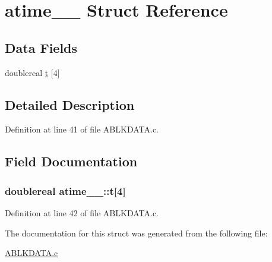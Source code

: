 \hypertarget{structatime__1__}{}\section{atime\+\_\+\_\+ Struct Reference}
\label{structatime__1__}
\subsection*{Data Fields}
\begin{DoxyCompactItemize}
\item 
doublereal \hyperlink{structatime__1___a95af57ab7a33be53f8e11c999c5c9682}{t} \mbox{[}4\mbox{]}
\end{DoxyCompactItemize}


\subsection{Detailed Description}


Definition at line 41 of file A\+B\+L\+K\+D\+A\+T\+A.\+c.



\subsection{Field Documentation}
\subsubsection[{\texorpdfstring{t}{t}}]{\setlength{\rightskip}{0pt plus 5cm}doublereal atime\+\_\+\_\+\+::t\mbox{[}4\mbox{]}}\hypertarget{structatime__1___a95af57ab7a33be53f8e11c999c5c9682}{}\label{structatime__1___a95af57ab7a33be53f8e11c999c5c9682}


Definition at line 42 of file A\+B\+L\+K\+D\+A\+T\+A.\+c.



The documentation for this struct was generated from the following file\+:\begin{DoxyCompactItemize}
\item 
\hyperlink{ABLKDATA_8c}{A\+B\+L\+K\+D\+A\+T\+A.\+c}\end{DoxyCompactItemize}

